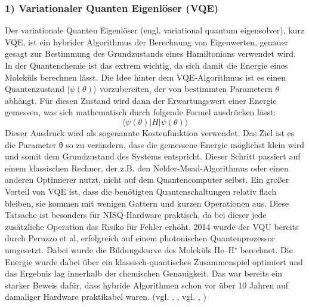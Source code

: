 \subsubsection*{1) Variationaler Quanten Eigenlöser (VQE)}
Der variationale Quanten Eigenlöser (engl, variational quantum eigensolver), kurz VQE, ist ein hybrider Algorithmus der Berechnung von Eigenwerten, genauer gesagt zur Bestimmung des Grundzustands eines Hamiltonians verwendet wird. In der Quantenchemie ist das extrem wichtig, da sich damit die Energie eines Moleküls berechnen lässt. Die Idee hinter dem VQE-Algorithmus ist es einen Quantenzustand $|\psi(\theta)\rangle$ vorzubereiten, der von bestimmten Parametern $\theta$ abhängt. Für diesen Zustand wird dann der Erwartungswert einer Energie gemessen, was sich mathematisch durch folgende Formel ausdrücken lässt:
$$
\langle\psi(\theta)|H|\psi(\theta)\rangle
$$
Dieser Ausdruck wird als sogenannte Kostenfunktion verwendet. Das Ziel ist es die Parameter θ so zu verändern, dass die gemessene Energie möglichst klein wird und somit dem Grundzustand des Systems entspricht. Dieser Schritt passiert auf einem klassischen Rechner, der z.B. den Nelder-Mead-Algorithmus oder einen anderen Optimierer nutzt, nicht auf dem Quantencomputer selbst. 
Ein großer Vorteil von VQE ist, dass die benötigten Quantenschaltungen relativ flach bleiben, sie kommen mit wenigen Gattern und kurzen Operationen aus. Diese Tatsache ist besonders für NISQ-Hardware praktisch, da bei dieser jede zusätzliche Operation das Risiko für Fehler erhöht. \label{nisq-definition}
2014 wurde der VQU bereits durch Peruzzo et al, erfolgreich auf einem photonischen Quantenprozessor umgesetzt. Dabei wurde die Bildungskurve des Moleküls He–H⁺ berechnet. Die Energie wurde dabei über ein klassisch-quantisches Zusammenspiel optimiert und das Ergebnis lag innerhalb der chemischen Genauigkeit. Das war bereits ein starker Beweis dafür, dass hybride Algorithmen schon vor über 10 Jahren auf damaliger Hardware praktikabel waren. 
(vgl. \citeauthor{cerezo_variational_nodate}, \citeyear{cerezo_variational_nodate}, vgl. \citeauthor{peruzzo_variational_nodate}, \citeyear{peruzzo_variational_nodate})
